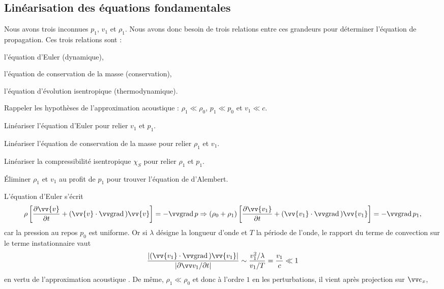 \documentclass[12pt,fancy]{cours}
\begin{document}
\subsection{Linéarisation des équations fondamentales}

Nous avons trois inconnues $p_1$, $v_1$ et $\rho_1$. Nous avons donc besoin de trois relations entre ces grandeurs pour déterminer l'équation de propagation. Ces trois relations sont : 
\begin{liste}
	\item
	l'équation d'Euler (dynamique),
	\item l'équation de conservation de la masse (conservation),
	\item l'équation d’évolution isentropique (thermodynamique).
\end{liste}
	
\begin{methode}
	\item Rappeler les hypothèses de l’approximation acoustique : $\rho_1 \ll \rho_0$, $p_1\ll p_0$ et $v_1 \ll c$.
	\item Linéariser l’équation d’Euler pour relier $v_1$ et $p_1$.
	\item Linéariser l’équation de conservation de la masse pour relier $\rho_1$ et $v_1$.
	\item  Linéariser la compressibilité isentropique $\chi_S$ pour relier $\rho_1$ et $p_1$.
	\item Éliminer $\rho_1$ et $v_1$ au profit de $p_1$ pour trouver l’équation de d’Alembert.
\end{methode}

 L'équation d'Euler s'écrit
\begin{equation}
\rho\left[\frac{\partial\vv{v}}{\partial t}+(\vv{v}\cdot\grad{})\vv{v}\right]=-\grad{p} \Rightarrow
(\rho_{0}+\rho_{1})\left[\frac{\partial\vv{v_1}}{\partial t}+(\vv{v_1}\cdot\grad{})\vv{v_1}\right]=-\grad{p_1},
\end{equation}
car la pression au repos $p_0$ est uniforme. Or si $\lambda$ désigne la longueur d'onde et $T$ la période de l'onde, le rapport du terme de convection sur le terme instationnaire vaut
\begin{equation}
\frac{\norme{(\vv{v_1}\cdot\grad{})\vv{v_1}}}{\norme{\partial{\Vec{v_1}}/\partial{t}}} \sim \frac{v_1^2/\lambda}{v_1/T} = \frac{v_1}{c} \ll 1
\end{equation}
en vertu de l'approximation acoustique . De même, $\rho_1 \ll \rho_0$ et donc à l'ordre $1$ en les perturbations, il vient après projection sur $\ex$,
\end{document}

